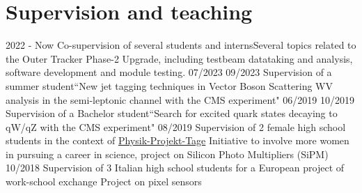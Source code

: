 \section{Supervision and teaching}


   \teaching
    {2022 - Now}
    {Co-supervision of several students and interns}{Several topics related to the  Outer Tracker Phase-2 Upgrade, including testbeam datataking and analysis, software development and module testing.}
  \teaching
    {07/2023 \textemdash{} 09/2023}
    {Supervision of a summer student}{``New jet tagging techniques in Vector Boson Scattering WV analysis in the semi-leptonic channel with the CMS experiment"}
  \teaching
    {06/2019 \textemdash{} 10/2019}
    {Supervision of a Bachelor student}{``Search for excited quark states decaying to qW/qZ with the CMS experiment"}
  \teaching
    {08/2019}
    {Supervision of 2 female high school students in the context of \href{https://www.ppt.uni-hamburg.de}{Physik-Projekt-Tage}}
    {Initiative to involve more women in pursuing a career in science, project on Silicon Photo Multipliers (SiPM)}
  \teaching
    {10/2018}
    {Supervision of 3 Italian high school students for a European project of work-school exchange}
    {Project on pixel sensors}

